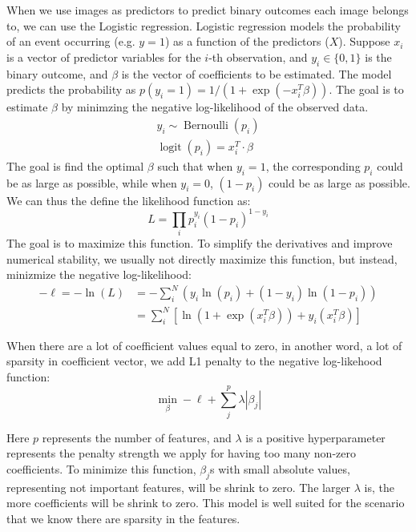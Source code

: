 \documentclass[12pt]{article}
\begin{document}
When we use images as predictors to predict binary outcomes each image belongs to, we can use the Logistic regression. Logistic regression models the probability of an event occurring (e.g. \( y = 1 \)) as a function of the predictors (\( X \)). Suppose \( x_i \) is a vector of predictor variables for the \( i \)-th observation, and \( y_i \in \{0, 1\} \) is the binary outcome, and \( \beta \) is the vector of coefficients to be estimated. The model predicts the probability as \( p(y_i = 1) = 1 / (1 + \exp(-x_i^T \beta)) \). The goal is to estimate \( \beta \) by minimzing the negative log-likelihood of the observed data.
\[
  \begin{gathered}
    y_i \sim \operatorname{Bernoulli} (p_i) \\
    \operatorname{logit} (p_i) = x_i^T \cdot \beta
  \end{gathered}
\]
The goal is find the optimal \( \beta \) such that when \( y_i = 1 \), the corresponding \( p_i \) could be as large as possible, while when \( y_i = 0 \), \( (1 - p_i) \) could be as large as possible. We can thus the define the likelihood function as:
\[
  L = \prod_i p_i^{y_i} (1 - p_i)^{1 - y_i}
\]
The goal is to maximize this function. To simplify the derivatives and improve numerical stability, we usually not directly maximize this function, but instead, minizmize the negative log-likelihood:
\[
  \begin{aligned}
    - \ell = - \ln(L) & =  - \sum_i^N (y_i \ln(p_i) + (1 - y_i) \ln(1 - p_i) ) \\
                      & = \sum_i^N \left[ \ln \left(1 + \exp(x_i^T \beta) \right) + y_i (x_i^T \beta) \right]
  \end{aligned}
\]

When there are a lot of coefficient values equal to zero, in another word, a lot of sparsity in coefficient vector, we add L1 penalty to the negative log-likehood function:
\[
  \min_{\beta} - \ell + \sum_j^p \lambda | \beta_j |
\]

Here \( p \) represents the number of features, and \( \lambda \) is a positive hyperparameter represents the penalty strength we apply for having too many non-zero coefficients. To minimize this function, \( \beta_j \)s with small absolute values, representing not important features, will be shrink to zero. The larger \( \lambda \) is, the more coefficients will be shrink to zero. This model is well suited for the scenario that we know there are sparsity in the features.
\end{document}
